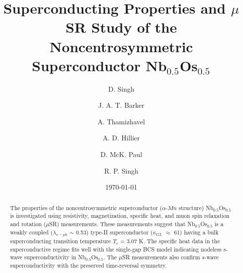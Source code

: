 \documentclass[reprint, superscriptaddress, secnumarabic, amssymb, nobibnotes, aps, prl]{revtex4-1}
\begin{document}
\title{\textrm{Superconducting Properties and $\mu$SR Study of the Noncentrosymmetric Superconductor Nb$_{0.5}$Os$_{0.5}$}}
\author{D. Singh}
\author{J. A. T. Barker}
\author{A. Thamizhavel}
\author{A. D. Hillier}
\author{D. McK. Paul}
\author{R. P. Singh}


\date{\today}
\begin{abstract}
\begin{flushleft}
\end{flushleft}
The properties of the noncentrosymmetric superconductor ($\alpha$-$\textit{Mn}$ structure)  Nb$_{0.5}$Os$_{0.5}$ is investigated using resistivity, magnetization, specific heat, and muon spin relaxation and rotation ($\mu$SR) measurements. These measurements suggest that Nb$_{0.5}$Os$_{0.5}$ is a weakly coupled ($\lambda_{e-ph}$ $\sim$ 0.53) type-II superconductor ($\kappa_{GL}$ $\approx$ 61) having a bulk superconducting transition temperature $T_c$ = 3.07 K. The specific heat data in the superconductive regime fits well with the single-gap BCS model indicating nodeless s-wave superconductivity in Nb$_{0.5}$Os$_{0.5}$. The $\mu$SR measurements also confirm $\textit{s}$-wave superconductivity with the preserved time-reversal symmetry.
\end{abstract}
\maketitle
\end{document}
